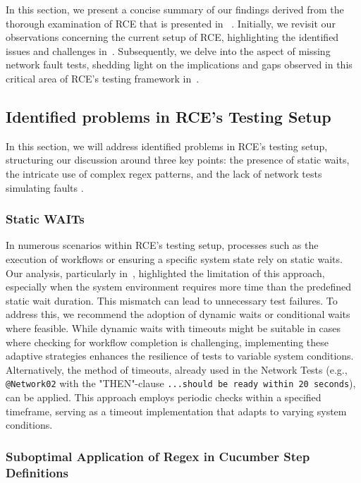 In this section, we present a concise summary of our findings derived from the thorough examination of \ac{RCE} that is presented in ~. Initially, we revisit our observations concerning the current setup of RCE, highlighting the identified issues and challenges in~. Subsequently, we delve into the aspect of missing network fault tests, shedding light on the implications and gaps observed in this critical area of RCE's testing framework in~. 

\subsection{Identified problems in RCE's Testing Setup}
\label{sub:identified-problems}
In this section, we will address identified problems in RCE's testing setup, structuring our discussion around three key points: the presence of static waits, the intricate use of complex regex patterns, and the lack of network tests simulating faults
.
\subsubsection{Static WAITs}
In numerous scenarios within \ac{RCE}'s testing setup, processes such as the execution of workflows or ensuring a specific system state rely on static waits. Our analysis, particularly in~, highlighted the limitation of this approach, especially when the system environment requires more time than the predefined static wait duration. This mismatch can lead to unnecessary test failures. To address this, we recommend the adoption of dynamic waits or conditional waits where feasible. While dynamic waits with timeouts might be suitable in cases where checking for workflow completion is challenging, implementing these adaptive strategies enhances the resilience of tests to variable system conditions. Alternatively, the method of timeouts, already used in the Network Tests (e.g., \verb|@Network02| with the "THEN"-clause \verb|...should be ready within 20 seconds|), can be applied. This approach employs periodic checks within a specified timeframe, serving as a timeout implementation that adapts to varying system conditions.


\subsubsection{Suboptimal Application of Regex in Cucumber Step Definitions}
\label{subsec:resultCucumber}

